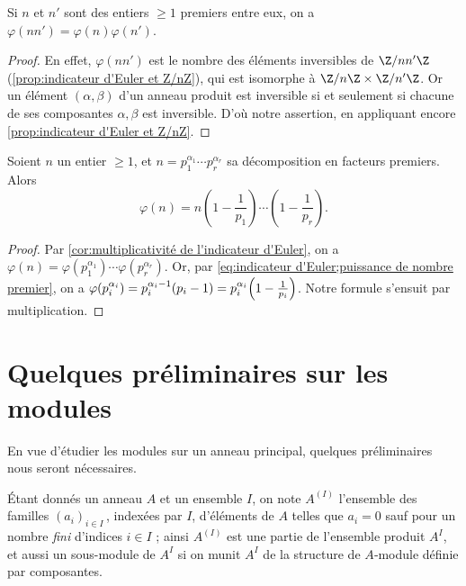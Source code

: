 \documentclass[11pt, useosf,
  title in boldface,
  theorem in new line,
  theorem numbering = section,
  number theorems separately,
]{simplivre}
\begin{document}
    \begin{corollary}\label{cor:multiplicativité de l'indicateur d'Euler}
        Si \( n \) et \( n' \) sont des entiers \( \geqslant 1 \) premiers entre eux, on a \( \varphi(nn') = \varphi(n)\varphi(n') \).
    \end{corollary}
    \begin{proof}
        En effet, \( \varphi(nn') \) est le nombre des éléments inversibles de \( \Z/nn'\Z \) (\cref{prop:indicateur d'Euler et Z/nZ}), qui est isomorphe à \( \Z/n\Z \times \Z/n'\Z \). Or un élément \( (\alpha,\beta) \) d'un anneau produit est inversible si et seulement si chacune de ses composantes \( \alpha,\beta \) est inversible. D'où notre assertion, en appliquant encore \cref{prop:indicateur d'Euler et Z/nZ}.
    \end{proof}

    \begin{corollary}
        Soient \( n \) un entier \( \geqslant 1 \), et \( n = p_1^{\alpha_1} \cdots p_r^{\alpha_r} \) sa décomposition en facteurs premiers. Alors
        \begin{equation}
            \varphi(n) = n \left(1 - \frac{1}{p_1}\right) \cdots \left(1 - \frac{1}{p_r}\right).
        \end{equation}
    \end{corollary}
    \begin{proof}
        Par \cref{cor:multiplicativité de l'indicateur d'Euler}, on a \( \varphi(n) = \varphi(p_1^{\alpha_1}) \cdots \varphi(p_r^{\alpha_r}) \). Or, par \eqref{eq:indicateur d'Euler;puissance de nombre premier}, on a \( \varphi(p_i^{\alpha_i}) = p_i^{\alpha_i-1}(p_i-1) = p_i^{\alpha_i} \Bigl(1-\frac{1}{p_i}\Bigr) \). Notre formule s'ensuit par multiplication.
    \end{proof}

\section{Quelques préliminaires sur les modules}\label{sec:quelques préliminaires sur les modules}

    En vue d'étudier les modules sur un anneau principal, quelques préliminaires nous seront nécessaires.

    Étant donnés un anneau \( A \) et un ensemble \( I \), on note \( A^{(I)} \) l'ensemble des familles \( (a_i)_{i \in I} \)\,, indexées par \( I \), d'éléments de \( A \) telles que \( a_i = 0 \) sauf pour un nombre \emph{fini} d'indices \( i \in I \) ;  ainsi \( A^{(I)} \) est une partie de l'ensemble produit \( A^I \), et aussi un sous-module de \( A^I \) si on munit \( A^I \) de la structure de \( A \)‑module définie par composantes.
\end{document}
